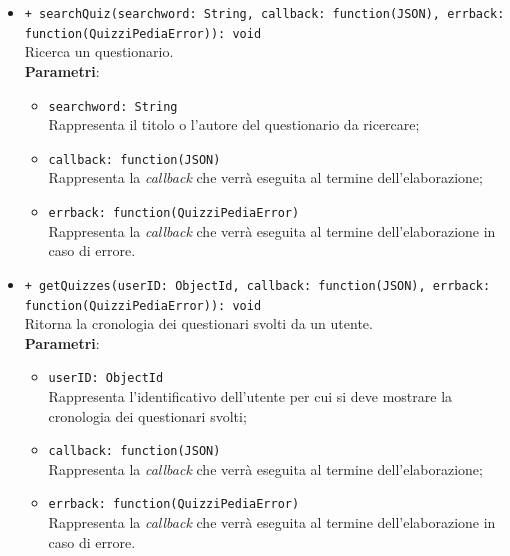 \begin{itemize}
\begin{itemize}
			\item \texttt{+ searchQuiz(searchword: String, callback: function(JSON), errback: function(QuizziPediaError)): void}\\
			Ricerca un questionario.\\
			\textbf{Parametri}:
			\begin{itemize}
				\item \texttt{searchword: String}\\
				Rappresenta il titolo o l'autore del questionario da ricercare;
				\item \texttt{callback: function(JSON)}\\
				Rappresenta la \textit{callback} che verrà eseguita al termine dell'elaborazione;
				\item \texttt{errback: function(QuizziPediaError)}\\
				Rappresenta la \textit{callback} che verrà eseguita al termine dell'elaborazione in caso di errore.
			\end{itemize}
			
			\item \texttt{+ getQuizzes(userID: ObjectId, callback: function(JSON), errback: function(QuizziPediaError)): void}\\
			Ritorna la cronologia dei questionari svolti da un utente.\\
			\textbf{Parametri}:
			\begin{itemize}
				\item \texttt{userID: ObjectId}\\
				Rappresenta l'identificativo dell'utente per cui si deve mostrare la cronologia dei questionari svolti;
				\item \texttt{callback: function(JSON)}\\
				Rappresenta la \textit{callback} che verrà eseguita al termine dell'elaborazione;
				\item \texttt{errback: function(QuizziPediaError)}\\
				Rappresenta la \textit{callback} che verrà eseguita al termine dell'elaborazione in caso di errore.
			\end{itemize}
		\end{itemize}
\end{itemize}